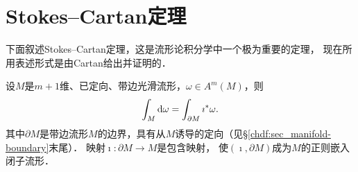\section{Stokes--Cartan定理}\label{chdf:sec_stokes-cartan}

下面叙述Stokes--Cartan定理，这是流形论积分学中一个极为重要的定理，
现在所用表述形式是由Cartan给出并证明的．

\begin{theorem}\label{chdf:thm_stokes-cartan}
    设$M$是$m+1$维、已定向、带边光滑流形，$\omega \in A^{m}(M)$，则
    \begin{equation}\label{chdf:eqn_stokes-cartan}
        \int_{M} {\rm d} \omega =  \int_{\partial M} \imath^{*} \omega .
    \end{equation}
    其中$\partial M$是带边流形$M$的边界，具有从$M$诱导的定向（见\S\ref{chdf:sec_manifold-boundary}末尾）．
    映射$\imath:\partial M \to M$是包含映射，
    使$(\imath,\partial M)$成为$M$的正则嵌入闭子流形．
\end{theorem}

